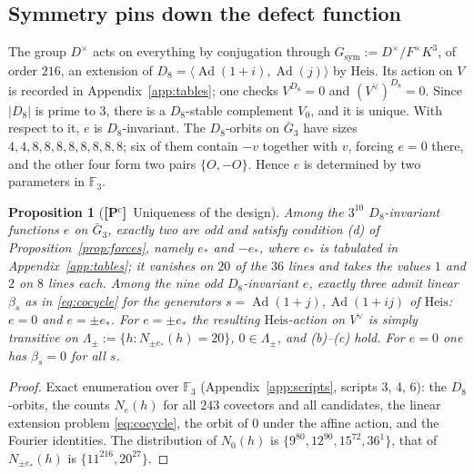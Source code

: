 \documentclass[11pt]{article}
\newcommand{\Fq}{\mathbb F}
\newcommand{\Ad}{\operatorname{Ad}}
\newcommand{\Heis}{\mathrm{Heis}}
\newcommand{\Pctag}{\textnormal{\textbf{[P$^{\mathrm c}$]}}}
\theoremstyle{plain}
\newtheorem{proposition}[theorem]{Proposition}
\theoremstyle{definition}
\begin{document}
\subsection{Symmetry pins down the defect function}
The group $D^\times$ acts on everything by conjugation through
$G_{\mathrm{sym}}:=D^\times/F^\times K^3$, of order $216$, an extension of
$D_8=\langle\Ad(1+i),\Ad(j)\rangle$ by $\Heis$.  Its action on $V$ is
recorded in Appendix~\ref{app:tables}; one checks $V^{D_8}=0$ and
$(V^\vee)^{D_8}=0$.  Since $|D_8|$ is prime to $3$, there is a
$D_8$-stable complement $V_0$, and it is unique.  With respect to it,
$e$ is $D_8$-invariant.  The $D_8$-orbits on $\bar G_3$ have sizes
$4,4,8,8,8,8,8,8,8,8$; six of them contain $-v$ together with $v$,
forcing $e=0$ there, and the other four form two pairs $\{O,-O\}$.
Hence $e$ is determined by two parameters in $\Fq_3$.

\begin{proposition}[\Pctag\ Uniqueness of the design]\label{prop:design}
Among the $3^{10}$ $D_8$-invariant functions $e$ on $\bar G_3$,
exactly two are odd and satisfy condition (d) of
Proposition~\ref{prop:forces}, namely $e_*$ and $-e_*$, where $e_*$ is
tabulated in Appendix~\ref{app:tables}; it vanishes on $20$ of the $36$
lines and takes the values $1$ and $2$ on $8$ lines each.  Among the
nine odd $D_8$-invariant $e$, exactly three admit linear
$\beta_s$ as in \eqref{eq:cocycle} for the generators
$s=\Ad(1+j),\Ad(1+ij)$ of $\Heis$: $e=0$ and $e=\pm e_*$.  For
$e=\pm e_*$ the resulting $\Heis$-action on $V^\vee$ is simply
transitive on $\Lambda_{\pm}:=\{h:N_{\pm e_*}(h)=20\}$, $0\in\Lambda_\pm$,
and (b)--(c) hold.  For $e=0$ one has $\beta_s=0$ for all $s$.
\end{proposition}
\begin{proof}
Exact enumeration over $\Fq_3$ (Appendix~\ref{app:scripts}, scripts
3, 4, 6): the $D_8$-orbits, the counts $N_e(h)$ for all $243$ covectors
and all candidates, the linear extension problem \eqref{eq:cocycle},
the orbit of $0$ under the affine action, and the Fourier identities.
The distribution of $N_0(h)$ is $\{9^{80},12^{90},15^{72},36^{1}\}$,
that of $N_{\pm e_*}(h)$ is $\{11^{216},20^{27}\}$.
\end{proof}
\end{document}
